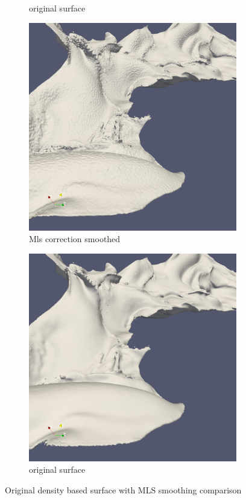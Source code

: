 \begin{figure}
\begin{center}
\begin{subfigure}[b]{0.47\textwidth}
			\caption{original surface}
		\end{subfigure}
		\begin{subfigure}[b]{0.47\textwidth}
			\includegraphics[width=\textwidth]{figures/CanionOriginal4.png}
			\caption{Mls correction smoothed}
		\end{subfigure}
		\begin{subfigure}[b]{0.47\textwidth}
			\includegraphics[width=\textwidth]{figures/CanionMls4.png}
			\caption{original surface}
		\end{subfigure}
	\end{center}
	\caption{Original density based surface with MLS smoothing comparison} \label{fig:db_mls_reconstruction4}
\end{figure}
